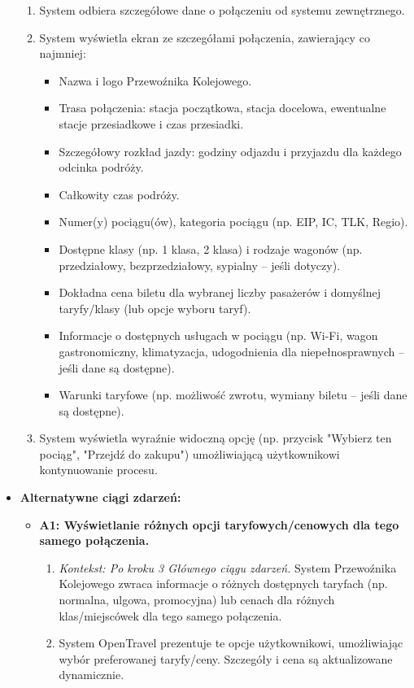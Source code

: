 \documentclass[a4paper,12pt]{article}
\begin{document}
\begin{itemize}
\begin{enumerate}
\item System odbiera szczegółowe dane o połączeniu od systemu zewnętrznego.
\item System wyświetla ekran ze szczegółami połączenia, zawierający co najmniej:
\begin{itemize}
\item Nazwa i logo Przewoźnika Kolejowego.
\item Trasa połączenia: stacja początkowa, stacja docelowa, ewentualne stacje przesiadkowe i czas przesiadki.
\item Szczegółowy rozkład jazdy: godziny odjazdu i przyjazdu dla każdego odcinka podróży.
\item Całkowity czas podróży.
\item Numer(y) pociągu(ów), kategoria pociągu (np. EIP, IC, TLK, Regio).
\item Dostępne klasy (np. 1 klasa, 2 klasa) i rodzaje wagonów (np. przedziałowy, bezprzedziałowy, sypialny – jeśli dotyczy).
\item Dokładna cena biletu dla wybranej liczby pasażerów i domyślnej taryfy/klasy (lub opcje wyboru taryf).
\item Informacje o dostępnych usługach w pociągu (np. Wi-Fi, wagon gastronomiczny, klimatyzacja, udogodnienia dla niepełnosprawnych – jeśli dane są dostępne).
\item Warunki taryfowe (np. możliwość zwrotu, wymiany biletu – jeśli dane są dostępne).
\end{itemize}
\item System wyświetla wyraźnie widoczną opcję (np. przycisk "Wybierz ten pociąg", "Przejdź do zakupu") umożliwiającą użytkownikowi kontynuowanie procesu.
\end{enumerate}
\item \textbf{Alternatywne ciągi zdarzeń:}
\begin{itemize}
\item \textbf{A1: Wyświetlanie różnych opcji taryfowych/cenowych dla tego samego połączenia.}
\begin{enumerate}
\item \textit{Kontekst: Po kroku 3 Głównego ciągu zdarzeń.} System Przewoźnika Kolejowego zwraca informacje o różnych dostępnych taryfach (np. normalna, ulgowa, promocyjna) lub cenach dla różnych klas/miejscówek dla tego samego połączenia.
\item System OpenTravel prezentuje te opcje użytkownikowi, umożliwiając wybór preferowanej taryfy/ceny. Szczegóły i cena są aktualizowane dynamicznie.
\end{enumerate}

\end{itemize}
\end{itemize}
\end{document}
